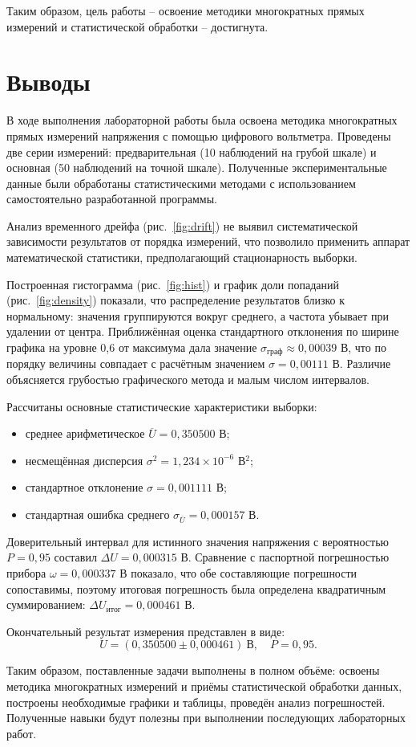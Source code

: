 Таким образом, цель работы – освоение методики многократных прямых измерений и статистической обработки – достигнута.

\section{Выводы}

В ходе выполнения лабораторной работы была освоена методика многократных прямых измерений напряжения с помощью цифрового вольтметра. Проведены две серии измерений: предварительная (10 наблюдений на грубой шкале) и основная (50 наблюдений на точной шкале). Полученные экспериментальные данные были обработаны статистическими методами с использованием самостоятельно разработанной программы.

Анализ временного дрейфа (рис.~\ref{fig:drift}) не выявил систематической зависимости результатов от порядка измерений, что позволило применить аппарат математической статистики, предполагающий стационарность выборки.

Построенная гистограмма (рис.~\ref{fig:hist}) и график доли попаданий (рис.~\ref{fig:density}) показали, что распределение результатов близко к нормальному: значения группируются вокруг среднего, а частота убывает при удалении от центра. Приближённая оценка стандартного отклонения по ширине графика на уровне 0,6 от максимума дала значение \(\sigma_{\text{граф}} \approx 0,00039\) В, что по порядку величины совпадает с расчётным значением \(\sigma = 0,00111\) В. Различие объясняется грубостью графического метода и малым числом интервалов.

Рассчитаны основные статистические характеристики выборки:
\begin{itemize}
    \item среднее арифметическое \(\overline{U} = 0,350500\) В;
    \item несмещённая дисперсия \(\sigma^2 = 1,234 \times 10^{-6}\) В\(^2\);
    \item стандартное отклонение \(\sigma = 0,001111\) В;
    \item стандартная ошибка среднего \(\sigma_{\overline{U}} = 0,000157\) В.
\end{itemize}
Доверительный интервал для истинного значения напряжения с вероятностью \(P = 0,95\) составил \(\Delta U = 0,000315\) В. Сравнение с паспортной погрешностью прибора \(\omega = 0,000337\) В показало, что обе составляющие погрешности сопоставимы, поэтому итоговая погрешность была определена квадратичным суммированием: \(\Delta U_{\text{итог}} = 0,000461\) В.

Окончательный результат измерения представлен в виде:
\[
U = (0,350500 \pm 0,000461)\ \text{В},\quad P = 0,95.
\]

Таким образом, поставленные задачи выполнены в полном объёме: освоены методика многократных измерений и приёмы статистической обработки данных, построены необходимые графики и таблицы, проведён анализ погрешностей. Полученные навыки будут полезны при выполнении последующих лабораторных работ.
